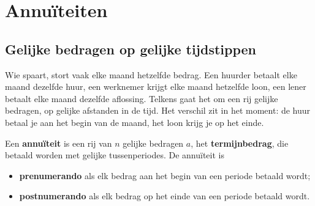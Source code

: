 \begin{oefeningen}[Start]

\end{oefeningen}


\section{Annuïteiten}

\subsection{Gelijke bedragen op gelijke tijdstippen}

Wie spaart, stort vaak elke maand hetzelfde bedrag. Een huurder betaalt elke maand dezelfde huur, een werknemer krijgt elke maand hetzelfde loon, een lener betaalt elke maand dezelfde aflossing. Telkens gaat het om een rij gelijke bedragen, op gelijke afstanden in de tijd. Het verschil zit in het moment: de huur betaal je aan het begin van de maand, het loon krijg je op het einde.

\begin{theorie}
Een \textbf{\textcolor{accent}{annuïteit}} is een rij van $n$ gelijke bedragen $a$, het \textbf{\textcolor{accent}{termijnbedrag}}, die betaald worden met gelijke tussenperiodes. De annuïteit is
\begin{itemize}
\item \textbf{\textcolor{accent}{prenumerando}} als elk bedrag aan het begin van een periode betaald wordt;
\item \textbf{\textcolor{accent}{postnumerando}} als elk bedrag op het einde van een periode betaald wordt.
\end{itemize}
\end{theorie}


